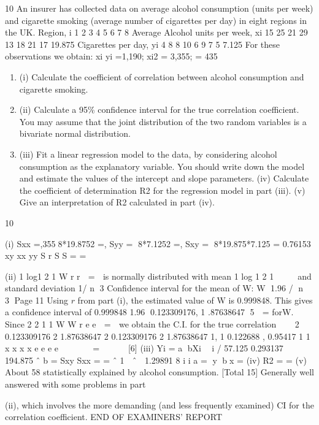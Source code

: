 
10 An insurer has collected data on average alcohol consumption (units per week) and
cigarette smoking (average number of cigarettes per day) in eight regions in the UK.
Region, i 1 2 3 4 5 6 7 8 Average
Alcohol units per week, xi 15 25 21 29 13 18 21 17 19.875
Cigarettes per day, yi 4 8 8 10 6 9 7 5 7.125
For these observations we obtain:
  \sum xi yi =1,190; \sum xi2 = 3,355;  = 435
  \begin{enumerate}
\item (i) Calculate the coefficient of correlation between alcohol consumption and
cigarette smoking. 
\item (ii) Calculate a 95\% confidence interval for the true correlation coefficient. You may assume that the joint distribution of the two random variables is a
bivariate normal distribution. 
\item (iii) Fit a linear regression model to the data, by considering alcohol consumption as the explanatory variable. You should write down the model and estimate
the values of the intercept and slope parameters. 
(iv) Calculate the coefficient of determination R2 for the regression model in
part (iii). 
(v) Give an interpretation of R2 calculated in part (iv). 
\end{enumerate}
\newpage


10 \item (i) Sxx \;=,3558*19.8752 \;=,
Syy \;= 8*7.1252 \;=,
Sxy \;= 8*19.875*7.125 \;=
0.76153
xy
xx yy
S
r
S S
\;=\; \;=\; 
\item (ii) 1 log1
2 1
W r
r

\;=\;

is normally distributed with mean 1 log 1
2 1
 
 
and standard
deviation 1/ n 3
Confidence interval for the mean of W: W 1.96 / n  3
Page 11
Using $r$ from part (i), the estimated value of W is 0.999848.
This gives a confidence interval of
0.999848 1.96 0.123309176, 1 .87638647
5
 \;=\; forW.
Since
2
2
1
1
W
W
r e
e

\;=\;

we obtain the C.I. for the true correlation 
 
2 0.123309176 2 1.87638647
2 0.123309176 2 1.87638647
1, 1 0.122688 , 0.95417
1 1
x x
x x
e e
e e
   
  \;=\;
   
[6]
(iii) Yi \;=\; a bXi  i
/ 57.125 0.293137
194.875
ˆ b \;=\; Sxy Sxx \;=\; \;=\;
ˆ 1  ˆ  1.29891
8 i i a \;=\; y bx \;=\; 
(iv) R2 \;= \;= 
(v) About 58%
statistically explained by alcohol consumption. 
[Total 15]
Generally well answered with some problems in part \item (ii), which involves the more demanding
(and less frequently examined) CI for the correlation coefficient.
END OF EXAMINERS’ REPORT

